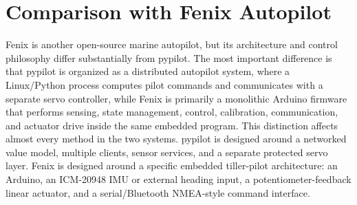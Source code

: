 \documentclass[11pt,twocolumn]{article}
\begin{document}
\section{Comparison with Fenix Autopilot}
\label{sec:fenix-comparison}
Fenix is another open-source marine autopilot, but its architecture and
control philosophy differ substantially from pypilot.  The most important
difference is that pypilot is organized as a distributed autopilot system,
where a Linux/Python process computes pilot commands and communicates with
a separate servo controller, while Fenix is primarily a monolithic Arduino
firmware that performs sensing, state management, control, calibration,
communication, and actuator drive inside the same embedded program.
This distinction affects almost every method in the two systems.  pypilot
is designed around a networked value model, multiple clients, sensor
services, and a separate protected servo layer.  Fenix is designed around a
specific embedded tiller-pilot architecture: an Arduino, an ICM-20948 IMU
or external heading input, a potentiometer-feedback linear actuator, and a
serial/Bluetooth NMEA-style command interface.
\end{document}
